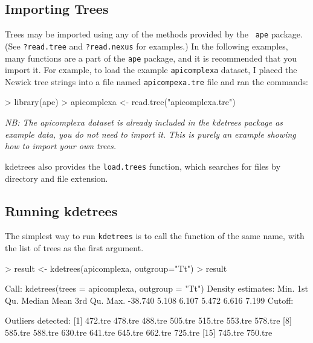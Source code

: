 \documentclass{article}
\newcommand{\ape}{{\tt ape}}
\begin{document}


\subsection{Importing Trees}
\label{sec:importing-trees}

Trees may be imported using any of the methods provided by the {\tt
  ape} package. (See {\tt ?read.tree} and {\tt ?read.nexus} for
examples.) In the following examples, many functions are a part of the
\ape{} package, and it is recommended that you import it. For
example, to load the example {\tt apicomplexa} dataset, I placed the
Newick tree strings into a file named {\tt apicompexa.tre} file and
ran the commands:
\begin{Schunk}
\begin{Sinput}
> library(ape)
> apicomplexa <- read.tree("apicomplexa.tre")
\end{Sinput}
\end{Schunk}
\emph{NB: The apicomplexa dataset is already included in the
  kdetrees package as example data, you do not need to import it. This
  is purely an example showing how to import your own trees.}

kdetrees also provides the {\tt load.trees} function, which searches
for files by directory and file extension.

\subsection{Running kdetrees}
\label{sec:running-kdetrees}

The simplest way to run {\tt kdetrees} is to call the function of the
same name, with the list of trees as the first argument.
\begin{Schunk}
\begin{Sinput}
> result <- kdetrees(apicomplexa, outgroup="Tt")
> result
\end{Sinput}
\begin{Soutput}
Call: kdetrees(trees = apicomplexa, outgroup = "Tt")
Density estimates:
   Min. 1st Qu.  Median    Mean 3rd Qu.    Max. 
-38.740   5.108   6.107   5.472   6.616   7.199 
Cutoff:  

Outliers detected:
 [1] 472.tre 478.tre 488.tre 505.tre 515.tre 553.tre 578.tre
 [8] 585.tre 588.tre 630.tre 641.tre 645.tre 662.tre 725.tre
[15] 745.tre 750.tre
\end{Soutput}
\end{Schunk}
\end{document}
